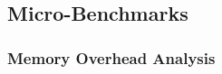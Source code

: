 \documentclass[../../main.tex]{subfiles}
\begin{document}
\subsection{Micro-Benchmarks}
\subsubsection{Memory Overhead Analysis}

\end{document}
